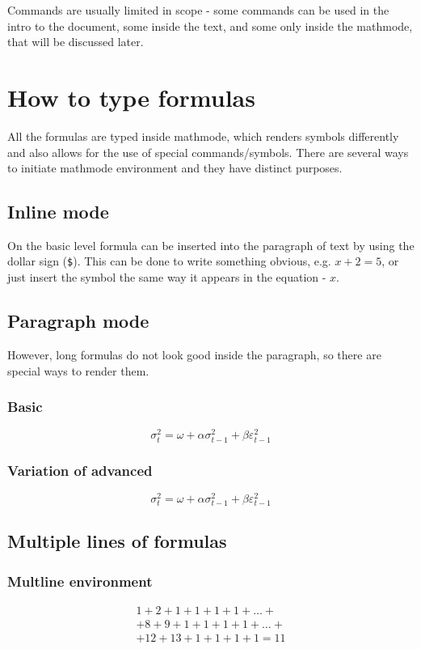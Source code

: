 \documentclass[a4paper, 12pt]{article}
\begin{document}
Commands are usually limited in scope - some commands can be used in the intro to the document, some inside the text, and some only inside the mathmode, that will be discussed later.
\section{How to type formulas}
All the formulas are typed inside mathmode, which renders symbols differently and also allows for the use of special commands/symbols. There are several ways to initiate mathmode environment and they have distinct purposes.

\subsection{Inline mode}
On the basic level formula can be inserted into the paragraph of text by using the dollar sign (\verb|$|). This can be done to write something obvious, e.g. $x+2=5$, or just insert the symbol the same way it appears in the equation - $x$.

\newpage
\subsection{Paragraph mode}
However, long formulas do not look good inside the paragraph, so there are special ways to render them.

\subsubsection{Basic}
\[\sigma^2_t = \omega + \alpha\sigma^2_{t-1}+\beta\varepsilon^2_{t-1}\]

\subsubsection{Variation of advanced}
\begin{equation}
\label{eq:garch_1_1}
    \sigma^2_t = \omega + \alpha\sigma^2_{t-1}+\beta\varepsilon^2_{t-1}
\end{equation}

\subsection{Multiple lines of formulas}

\subsubsection{Multline environment}
\begin{multline}
    1+2+1+1+1+1+\dots+\\
    +8+9+1+1+1+1+\dots+\\
    +12+13+1+1+1+1=11 
\end{multline}
\end{document}
